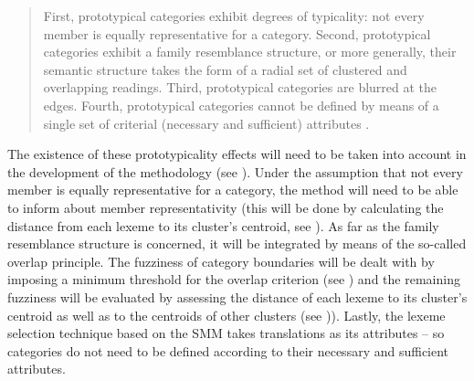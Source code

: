\begin{quote}
First, prototypical categories exhibit degrees of typicality: not every member is equally representative for a category. Second, prototypical categories exhibit a family resemblance structure, or more generally, their semantic structure takes the form of a radial set of clustered and overlapping readings. Third, prototypical categories are blurred at the edges. Fourth, prototypical categories cannot be defined by means of a single set of criterial (necessary and sufficient) attributes \citep[187]{geeraerts_theories_2010}.
\end{quote}

The existence of these prototypicality effects will need to be taken into account in the development of the methodology (see ). Under the assumption that not every member is equally representative for a category, the method will need to be able to inform about member representativity (this will be done by calculating the distance from each lexeme to its cluster’s centroid, see ). As far as the family resemblance structure is concerned, it will be integrated by means of the so-called overlap principle. The fuzziness of category boundaries will be dealt with by imposing a minimum threshold for the overlap criterion (see ) and the remaining fuzziness will be evaluated by assessing the distance of each lexeme to its cluster’s centroid as well as to the centroids of other clusters (see )). Lastly, the lexeme selection technique based on the SMM takes translations as its attributes – so categories do not need to be defined according to their necessary and sufficient attributes.

